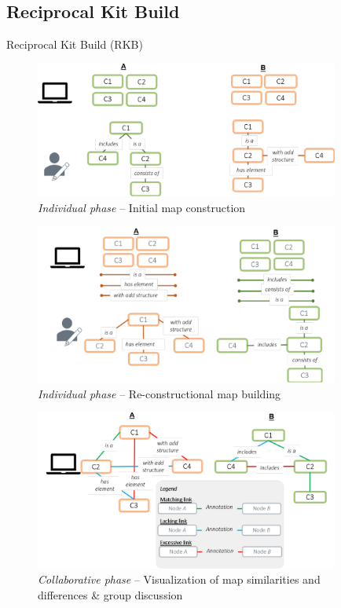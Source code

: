 \subsection{Reciprocal Kit Build}
\begin{frame}[allowframebreaks]{Reciprocal Kit Build (RKB)}
    
     \begin{figure}[tb]
         \begin{center}
         \includegraphics[width=100mm]{images/RKB_p1.pdf}
         \end{center}
         \caption{\emph{Individual phase} -- Initial map construction}
         \label{intro::rkb_p1}
     \end{figure}
    
     \begin{figure}[tb]
         \begin{center}
             \includegraphics[width=100mm]{images/RKB_p2.pdf}
         \end{center}
         \caption{\emph{Individual phase} -- Re-constructional map building}
         \label{intro::rkb_p2}
     \end{figure}
    
     \begin{figure}[tb]
         \begin{center}
             \includegraphics[width=100mm]{images/RKB_p3.pdf}
         \end{center}
         \caption{\emph{Collaborative phase} -- Visualization of map similarities and differences \& group discussion}
         \label{intro::rkb_p3}
     \end{figure}
    

\end{frame}
